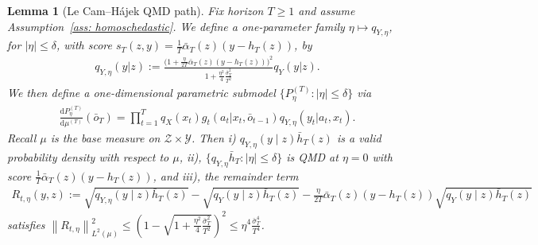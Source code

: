 \documentclass[11pt]{article}
\newtheorem{lem}{Lemma}
\begin{document}
\begin{lem}[Le Cam--H{\'a}jek QMD path]\label{lem:lch_qmd}
Fix horizon $T\geq 1$ and assume Assumption~\ref{ass: homoschedastic}. We define a one-parameter family $\eta \mapsto q_{Y, \eta}$, for $|\eta|\leq \delta$, with score $s_{T}(z, y) = \frac{1}{T}\bar{\alpha}_T(z)(y - h_T(z))$, by 
\begin{align}
    q_{Y, \eta}(y|z):= \frac{\big(1 + \frac{\eta}{2T}\bar{\alpha}_T(z)(y - h_T(z))\big)^2}{1 + \frac{\eta^2}{4}\frac{\bar{\sigma}_T^2}{T^2}}q_{Y}(y|z).\label{eq: q_Y_eta_def}
\end{align}We then define a one-dimensional parametric submodel $\{P^{(T)}_\eta:|\eta|\le\delta\}$ via
\begin{align*}
    \frac{\mathrm{d} P^{(T)}_{\eta}}{\mathrm{d}\mu^{(T)}}(\bar{o}_T) = \prod_{t=1}^{T}q_X(x_t)g_t(a_t|x_t, \bar{o}_{t-1})q_{Y, \eta}(y_t|a_t,x_t).
\end{align*}
Recall $\mu$ is the base measure on $\mathcal{Z}\times \mathcal{Y}$. Then i) $q_{Y,\eta}(y\mid z)\bar{h}_T(z)$ is a valid probability density with respect to $\mu$, ii), $\{q_{Y,\eta}\bar{h}_T: |\eta|\leq \delta\}$ is QMD at $\eta = 0$ with score $\frac{1}{T}\bar{\alpha}_T(z)(y - h_T(z))$, and iii), the remainder term
\begin{align*}
    R_{t,\eta}(y,z):= \sqrt{q_{Y,\eta}(y\mid z)\bar{h}_T(z)} - \sqrt{q_Y(y\mid z)\bar{h}_T(z)} - \frac{\eta}{2T}\bar{\alpha}_T(z)(y - h_T(z))\sqrt{q_{Y}(y\mid z)\bar{h}_T(z)}
\end{align*}
satisfies $\left\|R_{t,\eta}\right\|_{L^2(\mu)}^2 \leq \left(1 - \sqrt{1 + \frac{\eta^2}{4}\frac{\bar{\sigma}_T^2}{T^2}}\right)^2 \leq \eta^4 \frac{\bar{\sigma}_T^4}{T^4}$. 
\end{lem}
\end{document}
